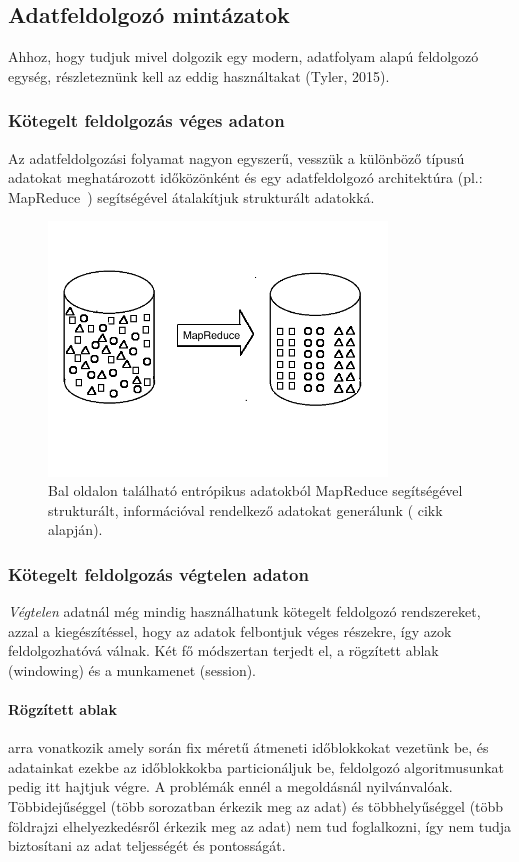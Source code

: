 \documentclass[a4paper,12pt]{article}
\begin{document}
\subsection{Adatfeldolgozó mintázatok}
Ahhoz, hogy tudjuk mivel dolgozik egy modern, adatfolyam alapú feldolgozó egység, részleteznünk kell az eddig használtakat (Tyler, 2015).

\subsubsection{Kötegelt feldolgozás véges adaton}
Az adatfeldolgozási folyamat nagyon egyszerű, vesszük a különböző típusú adatokat meghatározott időközönként és egy adatfeldolgozó architektúra (pl.: MapReduce~\parencite{mapreduce}) segítségével átalakítjuk strukturált adatokká.

\begin{figure}[ht!]
\centering
\includegraphics[width=90mm]{img/batch.png}
\caption{Bal oldalon található entrópikus adatokból MapReduce segítségével strukturált, információval rendelkező adatokat generálunk (\cite{tyler} cikk alapján). \label{batchreduce}}
\end{figure}

\subsubsection{Kötegelt feldolgozás végtelen adaton}
\textsl{Végtelen} adatnál még mindig használhatunk kötegelt feldolgozó rendszereket, azzal a kiegészítéssel, hogy az adatok felbontjuk véges részekre, így azok feldolgozhatóvá válnak. Két fő módszertan terjedt el, a rögzített ablak (windowing) és a munkamenet (session).

\paragraph{Rögzített ablak}\hspace*{-0.4cm} arra vonatkozik amely során fix méretű átmeneti időblokkokat vezetünk be, és adatainkat ezekbe az időblokkokba particionáljuk be, feldolgozó algoritmusunkat pedig itt hajtjuk végre. A problémák ennél a megoldásnál nyilvánvalóak. Többidejűséggel (több sorozatban érkezik meg az adat) és többhelyűséggel (több földrajzi elhelyezkedésről érkezik meg az adat) nem tud foglalkozni, így nem tudja biztosítani az adat teljességét és pontosságát.
\end{document}
